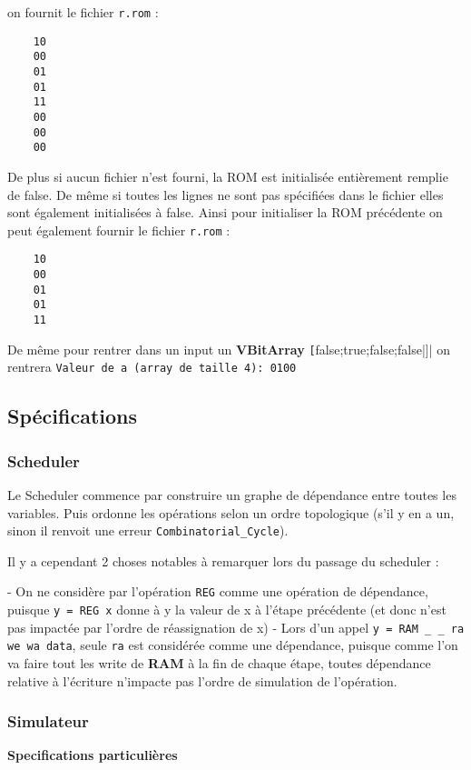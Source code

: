 \documentclass{article}
\begin{document}
on fournit le fichier \verb|r.rom| :

\begin{verbatim}
    10
    00
    01
    01
    11
    00
    00
    00
\end{verbatim}

De plus si aucun fichier n'est fourni, la ROM est initialisée entièrement remplie de false. De même si toutes les lignes ne sont pas spécifiées dans le fichier elles sont également initialisées à false. Ainsi pour initialiser la ROM précédente on peut également fournir le fichier \verb|r.rom| :

\begin{verbatim}
    10
    00
    01
    01
    11
\end{verbatim}

De même pour rentrer dans un input un \textbf{VBitArray} \verb|[|false;true;false;false|]| on rentrera \verb|Valeur de a (array de taille 4): 0100|

\subsection*{Spécifications }

\subsubsection*{Scheduler }

Le Scheduler commence par construire un graphe de dépendance entre toutes les variables. Puis ordonne les opérations selon un ordre topologique (s'il y en a un, sinon il renvoit une erreur \verb|Combinatorial_Cycle|).

Il y a cependant 2 choses notables à remarquer lors du passage du scheduler :

- On ne considère par l'opération \verb|REG| comme une opération de dépendance, puisque \verb|y = REG x| donne  à y la valeur de x à l'étape précédente (et donc n'est pas impactée par l'ordre de réassignation de x)
- Lors d'un appel \verb|y = RAM _ _ ra we wa data|, seule \verb|ra| est considérée comme une dépendance, puisque comme l'on va faire tout les write de \textbf{RAM} à la fin de chaque étape, toutes dépendance relative à l'écriture n'impacte pas l'ordre de simulation de l'opération.

\subsubsection*{Simulateur}
\textbf{Specifications particulières }
\end{document}
